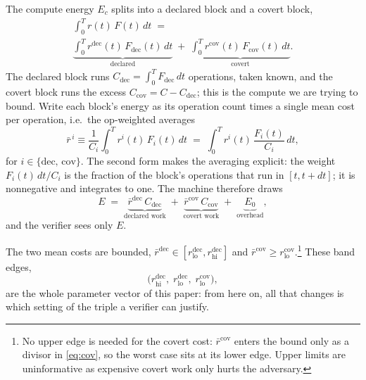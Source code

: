 \documentclass{article}
\theoremstyle{plain}
\theoremstyle{definition}
\theoremstyle{remark}
\begin{document}
The compute energy $E_c$ splits into a declared block and a covert block,
\begin{multline}
	\int_0^T r(t)\,F(t)\,dt \;=\;\\
	\underbrace{\int_0^T r^{\mathrm{dec}}(t)\,F_{\mathrm{dec}}(t)\,dt}_{\text{declared}} \;+\;
	\underbrace{\int_0^T r^{\mathrm{cov}}(t)\,F_{\mathrm{cov}}(t)\,dt}_{\text{covert}}.
	\label{eq:dec-cov-split}
\end{multline}
The declared block runs $C_{\mathrm{dec}} = \int_0^T F_{\mathrm{dec}}\,dt$
operations, taken known, and the covert block runs the excess
$C_{\mathrm{cov}} = C - C_{\mathrm{dec}}$; this is the compute we are trying
to bound. Write each block's energy as its operation count times a single mean
cost per operation, i.e.\ the op-weighted averages
\begin{equation}
	\bar r^{\,i} \equiv \frac{1}{C_{i}}\int_0^T r^{i}(t)\,F_{i}(t)\,dt
	\;=\; \int_0^T r^{i}(t)\,\frac{F_{i}(t)}{C_{i}}\,dt,
	\label{eq:barr}
\end{equation}
for $i \in \{\mathrm{dec},\,\mathrm{cov}\}$. The second form makes the
averaging explicit: the weight $F_{i}(t)\,dt/C_{i}$ is the fraction of the
block's operations that run in $[t, t+dt]$; it is nonnegative and integrates to
one. The machine therefore draws
\begin{equation}
	E \;=\; \underbrace{\bar r^{\mathrm{dec}}\, C_{\mathrm{dec}}}_{\text{declared work}}
	\;+\; \underbrace{\bar r^{\mathrm{cov}}\, C_{\mathrm{cov}}}_{\text{covert work}}
	\;+\; \underbrace{E_0}_{\text{overhead}},
	\label{eq:cheaterbudget}
\end{equation}
and the verifier sees only $E$.

The two mean costs are bounded,
$\bar r^{\mathrm{dec}} \in [r_{\mathrm{lo}}^{\mathrm{dec}}, r_{\mathrm{hi}}^{\mathrm{dec}}]$
and
$\bar r^{\mathrm{cov}} \ge r_{\mathrm{lo}}^{\mathrm{cov}}$.\footnote{No upper
edge is needed for the covert cost: $\bar r^{\mathrm{cov}}$ enters the bound
only as a divisor in \cref{eq:cov}, so the worst case sits at its lower edge. Upper limits are uninformative as expensive covert work only hurts the
adversary.} These band edges,
\begin{equation}
	\bigl(r_{\mathrm{hi}}^{\mathrm{dec}},\;r_{\mathrm{lo}}^{\mathrm{dec}},\;
	r_{\mathrm{lo}}^{\mathrm{cov}}\bigr),
	\label{eq:triple}
\end{equation}
are the whole parameter vector of this paper: from here on, all that changes
is which setting of the triple a verifier can justify.
\end{document}
